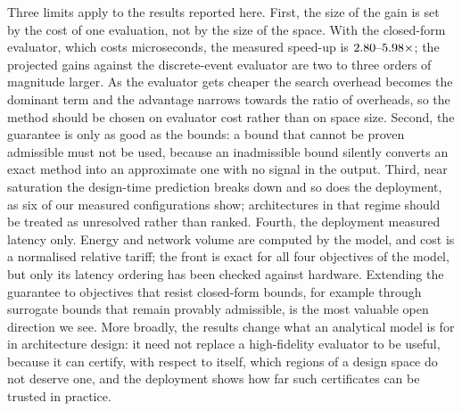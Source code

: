 Three limits apply to the results reported here. First, the size of the gain is set by the cost of one evaluation, not by the size of the
space. With the closed-form evaluator, which costs microseconds, the measured speed-up is
$2.80\text{--}5.98\times$; the projected gains against the discrete-event evaluator are two
to three orders of magnitude larger. As the evaluator gets cheaper the search overhead
becomes the dominant term and the advantage narrows towards the ratio of overheads, so
the method should be chosen on evaluator cost rather than on space size. Second, the
guarantee is only as good as the bounds: a bound that cannot be proven admissible must
not be used, because an inadmissible bound silently converts an exact method into an
approximate one with no signal in the output. Third, near saturation the design-time
prediction breaks down and so does the deployment, as six of our measured configurations
show; architectures in that regime should be treated as unresolved rather than ranked.
Fourth, the deployment measured latency only. Energy and network volume are computed by
the model, and cost is a normalised relative tariff; the front is exact for all four
objectives of the model, but only its latency ordering has been checked against hardware.
Extending the guarantee to objectives that resist closed-form bounds, for example through
surrogate bounds that remain provably admissible, is the most valuable open direction we
see. More broadly, the results change what an analytical model is for in architecture
design: it need not replace a high-fidelity evaluator to be useful, because it can
certify, with respect to itself, which regions of a design space do not deserve one, and
the deployment shows how far such certificates can be trusted in practice.
